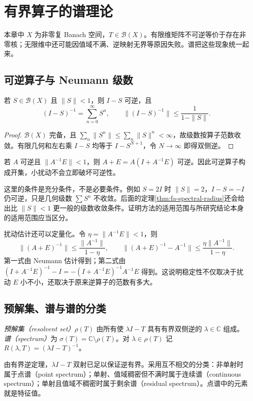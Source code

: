 \setcounter{chapter}{9} %
\chapter{有界算子的谱理论}
\label{chap:fa-spectrum}

本章中 $X$ 为非零复 Banach 空间，$T\in\mathcal B(X)$。有限维矩阵不可逆等价于存在非零核；无限维中还可能因值域不满、逆映射无界等原因失败。谱把这些现象统一起来。

\section{可逆算子与 Neumann 级数}
\begin{proposition}\label{prop:fa-neumann}
若 $S\in\mathcal B(X)$ 且 $\|S\|<1$，则 $I-S$ 可逆，且
\begin{equation}
 (I-S)^{-1}=\sum_{n=0}^{\infty}S^n,
 \qquad\|(I-S)^{-1}\|\leq\frac1{1-\|S\|}.
 \label{eq:fa-neumann-series}
\end{equation}
\end{proposition}
\begin{proof}
$\mathcal B(X)$ 完备，且 $\sum_n\|S^n\|\leq\sum_n\|S\|^n<\infty$，故级数按算子范数收敛。有限几何和左右乘 $I-S$ 均等于 $I-S^{N+1}$，令 $N\to\infty$ 即得双侧逆。
\end{proof}
若 $A$ 可逆且 $\|A^{-1}E\|<1$，则 $A+E=A(I+A^{-1}E)$ 可逆。因此可逆算子构成开集，小扰动不会立即破坏可逆性。

这里的条件是充分条件，不是必要条件。例如 $S=2I$ 时 $\|S\|=2$，$I-S=-I$ 仍可逆，只是几何级数 $\sum S^n$ 不收敛。后面的定理\ref{thm:fa-spectral-radius}还会给出比 $\|S\|<1$ 更一般的级数收敛条件。证明方法的适用范围与所研究结论本身的适用范围应当区分。

扰动估计还可以定量化。令 $\eta=\|A^{-1}E\|<1$，则
\[
 \|(A+E)^{-1}\|\leq\frac{\|A^{-1}\|}{1-\eta},\qquad
 \|(A+E)^{-1}-A^{-1}\|
 \leq\frac{\eta\|A^{-1}\|}{1-\eta}.
\]
第一式由 Neumann 估计得到；第二式由 $(I+A^{-1}E)^{-1}-I=-(I+A^{-1}E)^{-1}A^{-1}E$ 得到。这说明稳定性不仅取决于扰动 $E$ 小不小，还取决于原来逆算子的范数有多大。

\section{预解集、谱与谱的分类}
\begin{definition}
\emph{预解集（resolvent set）}$\rho(T)$ 由所有使 $\lambda I-T$ 具有有界双侧逆的 $\lambda\in\mathbb C$ 组成。\emph{谱（spectrum）}为 $\sigma(T)=\mathbb C\setminus\rho(T)$。对 $\lambda\in\rho(T)$ 记 $R(\lambda,T)=(\lambda I-T)^{-1}$。
\end{definition}
由有界逆定理，$\lambda I-T$ 双射已足以保证逆有界。采用互不相交的分类：非单射时属于点谱（point spectrum）；单射、值域稠密但不满时属于连续谱（continuous spectrum）；单射且值域不稠密时属于剩余谱（residual spectrum）。点谱中的元素就是特征值。

